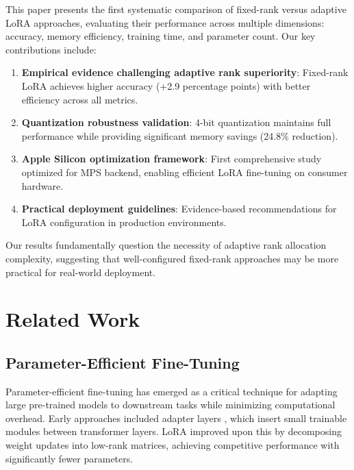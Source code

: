 \documentclass[11pt,a4paper]{article}
\begin{document}
This paper presents the first systematic comparison of fixed-rank versus adaptive LoRA approaches, evaluating their performance across multiple dimensions: accuracy, memory efficiency, training time, and parameter count. Our key contributions include:

\begin{enumerate}
    \item \textbf{Empirical evidence challenging adaptive rank superiority}: Fixed-rank LoRA achieves higher accuracy (+2.9 percentage points) with better efficiency across all metrics.
    
    \item \textbf{Quantization robustness validation}: 4-bit quantization maintains full performance while providing significant memory savings (24.8\% reduction).
    
    \item \textbf{Apple Silicon optimization framework}: First comprehensive study optimized for MPS backend, enabling efficient LoRA fine-tuning on consumer hardware.
    
    \item \textbf{Practical deployment guidelines}: Evidence-based recommendations for LoRA configuration in production environments.
\end{enumerate}

Our results fundamentally question the necessity of adaptive rank allocation complexity, suggesting that well-configured fixed-rank approaches may be more practical for real-world deployment.

\section{Related Work}

\subsection{Parameter-Efficient Fine-Tuning}

Parameter-efficient fine-tuning has emerged as a critical technique for adapting large pre-trained models to downstream tasks while minimizing computational overhead. Early approaches included adapter layers \cite{houlsby2019parameter}, which insert small trainable modules between transformer layers. LoRA \cite{hu2021lora} improved upon this by decomposing weight updates into low-rank matrices, achieving competitive performance with significantly fewer parameters.
\end{document}
